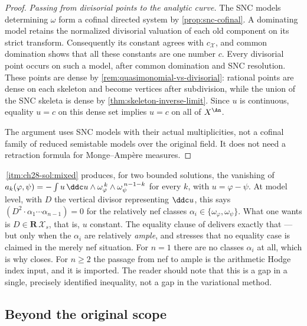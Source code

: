 \begin{proof}
\emph{Passing from divisorial points to the analytic curve.}
The SNC models determining \(\omega\) form a cofinal directed system
by \cref{prop:snc-cofinal}.  A dominating model retains the normalized
divisorial valuation of each old component on its strict transform.
Consequently its constant agrees with \(c_{\mathcal X}\), and common
domination shows that all these constants are one number \(c\).
Every divisorial point occurs on such a model, after common domination
and SNC resolution.  These points are dense by
\cref{rem:quasimonomial-vs-divisorial}: rational points are dense on each
skeleton and become vertices after subdivision, while the union of the
SNC skeleta is dense by \cref{thm:skeleton-inverse-limit}.
Since \(u\) is continuous, equality \(u=c\) on this dense set implies
\(u=c\) on all of \(X^{\An}\).

The argument uses SNC models with their actual multiplicities, not a
cofinal family of reduced semistable models over the original field.
It does not need a retraction formula for Monge--Amp\`ere measures.
\end{proof}

\begin{remark}
\label{rem:ch28-uniqueness-gap}
\,\cref{itm:ch28-sol:mixed} produces, for two
bounded solutions, the vanishing of
\(a_k(\varphi,\psi)=-\int u\,\ddc u\wedge
\omega_\varphi^{\,k}\wedge\omega_\psi^{\,n-1-k}\) for every \(k\), with
\(u=\varphi-\psi\).  At model level, with \(D\) the vertical divisor
representing \(\ddc u\), this says
\((D^2\cdot\alpha_1\cdots\alpha_{n-1})=0\) for the relatively nef classes
\(\alpha_i\in\{\omega_\varphi,\omega_\psi\}\).  What one wants is
\(D\in\mathbf R\,\mathcal X_s\), that is, \(u\) constant.  The equality
clause of  delivers exactly that ---
but only when the \(\alpha_i\) are relatively \emph{ample}, and
 stresses that no equality case is claimed in the
merely nef situation.  For \(n=1\) there are no classes
\(\alpha_i\) at all, which is why  closes.
For \(n\geq2\) the passage from nef to ample is the arithmetic Hodge index
input, and it is imported.  The reader should note that this is a gap in a
single, precisely identified inequality, not a gap in the variational
method.
\end{remark}

\subsection{Beyond the original scope}
\label{sec:ch28-surjectivity}

